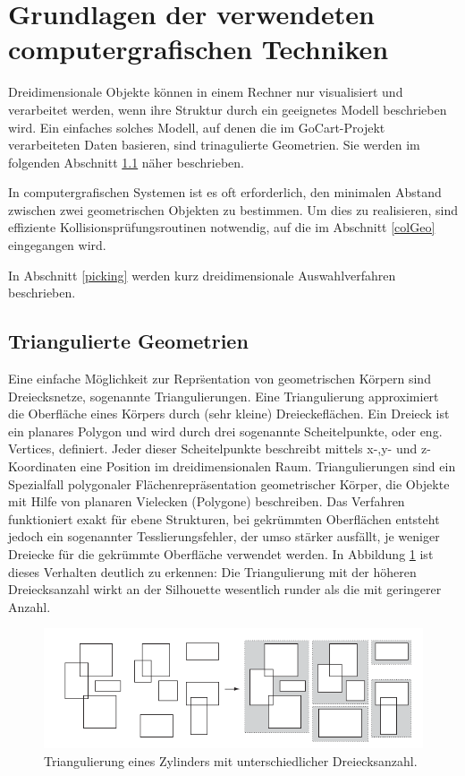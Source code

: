 
\section{Grundlagen der verwendeten computergrafischen Techniken}

Dreidimensionale Objekte k\"onnen in einem Rechner nur visualisiert und verarbeitet werden, wenn ihre Struktur durch ein geeignetes Modell beschrieben wird. Ein einfaches solches Modell, auf denen die im GoCart-Projekt verarbeiteten Daten basieren, sind trinagulierte Geometrien. Sie werden im folgenden Abschnitt \ref{triGeo} n\"aher beschrieben.

In computergrafischen Systemen ist es oft erforderlich, den minimalen Abstand zwischen zwei geometrischen Objekten zu bestimmen. Um dies zu realisieren, sind effiziente Kollisionspr\"ufungsroutinen notwendig, auf die im Abschnitt \ref{colGeo} eingegangen wird.
 
In Abschnitt \ref{picking} werden kurz dreidimensionale Auswahlverfahren beschrieben.
 
\subsection{Triangulierte Geometrien}
\label{triGeo}

Eine einfache M\"oglichkeit zur Repr\"sentation von geometrischen K\"orpern sind Dreiecksnetze, sogenannte Triangulierungen. Eine Triangulierung approximiert die Oberfl\"ache eines K\"orpers durch (sehr kleine) Dreieckefl\"achen. Ein Dreieck ist ein planares Polygon und wird durch drei sogenannte Scheitelpunkte, oder eng. Vertices, definiert. Jeder dieser Scheitelpunkte beschreibt mittels x-,y- und z-Koordinaten eine Position im dreidimensionalen Raum. Triangulierungen sind ein Spezialfall polygonaler Flächenrepräsentation geometrischer K\"orper, die Objekte mit Hilfe von planaren Vielecken (Polygone) beschreiben. Das Verfahren funktioniert exakt f\"ur ebene Strukturen, bei gekrümmten Oberfl\"achen entsteht jedoch ein sogenannter Tesslierungsfehler, der umso stärker ausf\"allt, je weniger Dreiecke für die gekr\"ummte Oberfl\"ache verwendet werden. In Abbildung \ref{triangulation} ist dieses Verhalten deutlich zu erkennen: Die Triangulierung mit der h\"oheren Dreiecksanzahl wirkt an der Silhouette wesentlich runder als die mit geringerer Anzahl. 

\begin{figure}[H]
\centerline{
	\includegraphics[width=0.7\columnwidth]{graphics/box.png}
}
\caption{Triangulierung eines Zylinders mit unterschiedlicher Dreiecksanzahl.}
\label{triangulation}
\end{figure}


